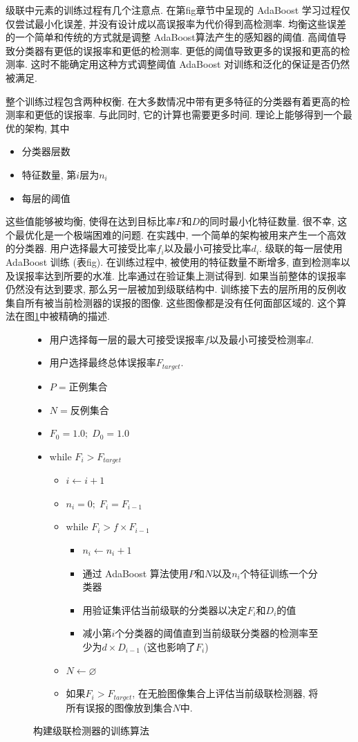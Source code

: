 \documentclass[a4paper,utf8,11pt, onecolumn]{ctexart}
\begin{document}
级联中元素的训练过程有几个注意点. 在第fig章节中呈现的 AdaBoost 学习过程仅仅尝试最小化误差, 并没有设计成以高误报率为代价得到高检测率. 均衡这些误差的一个简单和传统的方式就是调整 AdaBoost算法产生的感知器的阈值. 高阈值导致分类器有更低的误报率和更低的检测率. 更低的阈值导致更多的误报和更高的检测率. 这时不能确定用这种方式调整阈值 AdaBoost 对训练和泛化的保证是否仍然被满足.

整个训练过程包含两种权衡. 在大多数情况中带有更多特征的分类器有着更高的检测率和更低的误报率. 与此同时, 它的计算也需要更多时间. 理论上能够得到一个最优的架构, 其中
\begin{itemize}
\item 分类器层数
\item 特征数量, 第$i$层为$n_i$
\item 每层的阈值
\end{itemize}
这些值能够被均衡, 使得在达到目标比率$F$和$D$的同时最小化特征数量. 很不幸, 这个最优化是一个极端困难的问题.
在实践中, 一个简单的架构被用来产生一个高效的分类器. 用户选择最大可接受比率$f_i$以及最小可接受比率$d_i$. 级联的每一层使用 AdaBoost 训练 (表fig). 在训练过程中, 被使用的特征数量不断增多, 直到检测率以及误报率达到所要的水准. 比率通过在验证集上测试得到. 如果当前整体的误报率仍然没有达到要求, 那么另一层被加到级联结构中. 训练接下去的层所用的反例收集自所有被当前检测器的误报的图像. 这些图像都是没有任何面部区域的. 这个算法在图\ref{fig:train}中被精确的描述.
\begin{figure}[!htb]
  \caption{构建级联检测器的训练算法}
  \label{fig:train}
  \kaishu{}
  \begin{itemize}
  \item 用户选择每一层的最大可接受误报率$f$以及最小可接受检测率$d$.
  \item 用户选择最终总体误报率$F_{target}$.
  \item $P=$正例集合
  \item $N=$反例集合
  \item $F_0=1.0;\;D_0=1.0$
  \item while $F_i>F_{target}$
    \begin{itemize}
    \item $i\leftarrow i+1$
    \item $n_i=0;\;F_i=F_{i-1}$
    \item while $F_i>f\times F_{i-1}$
      \begin{itemize}
      \item $n_i\leftarrow n_i+1$
      \item 通过 AdaBoost 算法使用$P$和$N$以及$n_i$个特征训练一个分类器
      \item 用验证集评估当前级联的分类器以决定$F_i$和$D_i$的值
      \item 减小第$i$个分类器的阈值直到当前级联分类器的检测率至少为$d\times D_{i-1}$ (这也影响了$F_i$)
      \end{itemize}
    \item $N\leftarrow\varnothing$
    \item 如果$F_i>F_{target}$, 在无脸图像集合上评估当前级联检测器, 将所有误报的图像放到集合$N$中.
    \end{itemize}
\end{itemize}
\end{figure}
\end{document}
